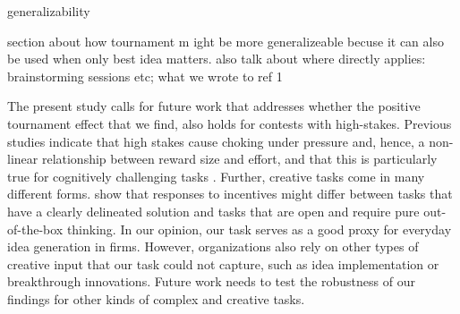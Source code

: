 generalizability

section about how tournament m ight be more generalizeable becuse it can also be used when only best idea matters.
also talk about where directly applies: brainstorming sessions etc; what we wrote to ref 1


The present study  calls for  future work that addresses whether the positive tournament 
effect that we find, also holds for contests with high-stakes. 
Previous studies indicate that high stakes cause choking under 
pressure and, hence, a non-linear relationship between reward size and effort, and that this is 
particularly true for cognitively challenging tasks \citep{Ariely2009b, Brach12MSa}.
Further, creative tasks come in many different forms. \citet{charness12WP} 
 show that responses to incentives might differ between tasks that have a clearly 
delineated solution and tasks that are open and require pure  out-of-the-box thinking. In our opinion, our task serves as a good proxy for everyday idea 
generation in firms. However, organizations also rely on other types of creative input that 
our task could not capture, such as  idea implementation or breakthrough 
innovations. 
Future work needs to test the robustness of our findings for  other kinds of 
complex and creative tasks. 
  

